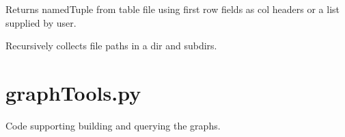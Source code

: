 \documentclass[letterpaper,10pt,english]{sphinxmanual}
\begin{document}
\begin{fulllineitems}
\label{code:gfunc.fileIO.tableFile2namedTuple}
Returns namedTuple from table file using first row fields as
col headers or a list supplied by user.

\end{fulllineitems}


\begin{fulllineitems}
\label{code:gfunc.fileIO.walk_dirs_for_fileName}
Recursively collects file paths in a dir and subdirs.

\end{fulllineitems}

\label{code:module-gfunc.graphTools}

\section{graphTools.py}
\label{code:graphtools-py}
Code supporting building and querying the graphs.
\end{document}
